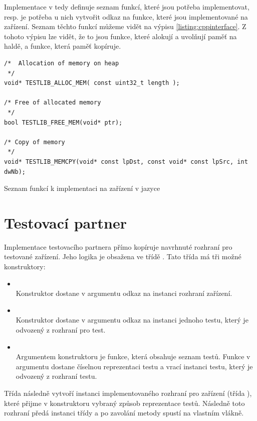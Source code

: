 Implementace v \cpp{} tedy definuje seznam funkcí, které jsou potřeba implementovat, resp. je potřeba u nich vytvořit odkaz na funkce, které jsou implementované na zařízení. Seznam těchto funkcí můžeme vidět na výpisu \ref{listing:cppinterface}. Z tohoto výpisu lze vidět, že to jsou funkce, které alokují a uvolňují paměť na haldě, a funkce, která paměť kopíruje. 

\begin{listing}[H]
    \centering
    \begin{verbatim}
/*  Allocation of memory on heap 
 */
void* TESTLIB_ALLOC_MEM( const uint32_t length );

/* Free of allocated memory 
 */
bool TESTLIB_FREE_MEM(void* ptr);

/* Copy of memory 
 */
void* TESTLIB_MEMCPY(void* const lpDst, const void* const lpSrc, int dwNb);
    \end{verbatim}
    \caption{Seznam funkcí k implementaci na zařízení v jazyce \protect\cpp{}}
    \label{listing:cppinterface}
\end{listing}


\section{Testovací partner}
Implementace testovacího partnera přímo kopíruje navrhnuté rozhraní pro testované zařízení. Jeho logika je obsažena ve třídě . Tato třída má tři možné konstruktory:

\begin{itemize} 
    \item {} \\
    Konstruktor dostane v argumentu odkaz na instanci rozhraní zařízení.
    \item {} \\
    Konstruktor dostane v argumentu odkaz na instanci jednoho testu, který je odvozený z rozhraní pro test.
    \item {} \\
    Argumentem konstruktoru je funkce, která obsahuje seznam testů. Funkce v argumentu dostane číselnou reprezentaci testu a vrací instanci testu, který je odvozený z rozhraní testu.
\end{itemize}

Třída následně vytvoří instanci implementovaného rozhraní pro zařízení (třída ), které přijme v konstruktoru vybraný způsob reprezentace testů. Následně toto rozhraní předá instanci třídy  a po zavolání metody  spustí  na vlastním vlákně.


